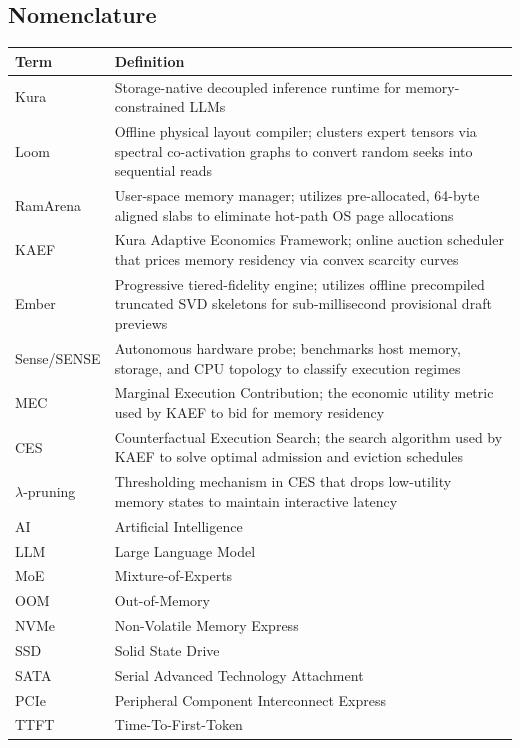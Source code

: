 \subsection*{Nomenclature}
\begin{table}[t]
\centering
\scriptsize
\renewcommand{\arraystretch}{0.88}
\begin{tabular}{lp{}}
\toprule
\textbf{Term} & \textbf{Definition} \\
\midrule
Kura & Storage-native decoupled inference runtime for memory-constrained LLMs \\
Loom & Offline physical layout compiler; clusters expert tensors via spectral co-activation graphs to convert random seeks into sequential reads \\
RamArena & User-space memory manager; utilizes pre-allocated, 64-byte aligned slabs to eliminate hot-path OS page allocations \\
KAEF & Kura Adaptive Economics Framework; online auction scheduler that prices memory residency via convex scarcity curves \\
Ember & Progressive tiered-fidelity engine; utilizes offline precompiled truncated SVD skeletons for sub-millisecond provisional draft previews \\
Sense/SENSE & Autonomous hardware probe; benchmarks host memory, storage, and CPU topology to classify execution regimes \\
MEC & Marginal Execution Contribution; the economic utility metric used by KAEF to bid for memory residency \\
CES & Counterfactual Execution Search; the search algorithm used by KAEF to solve optimal admission and eviction schedules \\
$\lambda$-pruning & Thresholding mechanism in CES that drops low-utility memory states to maintain interactive latency \\
\midrule
AI & Artificial Intelligence \\
LLM & Large Language Model \\
MoE & Mixture-of-Experts \\
OOM & Out-of-Memory \\
NVMe & Non-Volatile Memory Express \\
SSD & Solid State Drive \\
SATA & Serial Advanced Technology Attachment \\
PCIe & Peripheral Component Interconnect Express \\
TTFT & Time-To-First-Token \\

\end{tabular}
\end{table}
